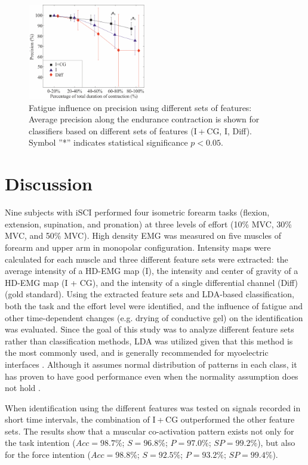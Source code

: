 \begin{figure}[ht]
\centering
\includegraphics[width=0.459\textwidth]{Images/figure1_10.png}
\caption{Fatigue influence on precision using different sets of features: Average precision along the endurance contraction is shown for classifiers based on different sets of features (I + CG, I, Diff). Symbol ”*” indicates statistical significance $p < 0.05$.}
\label{fig:1-10}
\end{figure}      



\section{Discussion}
Nine subjects with iSCI performed four isometric forearm tasks (flexion, extension, supination, and pronation) at three levels of effort (10\% MVC, 30\% MVC, and 50\% MVC). High density EMG was measured on five muscles of forearm and upper arm in monopolar configuration. Intensity maps were calculated for each muscle and three different feature sets were extracted: the average intensity of a HD-EMG map (I), the intensity and center of gravity of a HD-EMG map (I + CG), and the intensity of a single differential channel (Diff) (gold standard). Using the extracted feature sets and LDA-based classification, both the task and the effort level were identified, and the influence of fatigue and other time-dependent changes (e.g. drying of conductive gel) on the identification was evaluated. Since the goal of this study was to analyze different feature sets rather than classification methods, LDA was utilized given that this method is the most commonly used, and is generally recommended for myoelectric interfaces \citep{Hakonen2015}. Although it assumes normal distribution of patterns in each class, it has proven to have good performance even when the normality assumption does not hold \citep{Grouven1996}.

When identification using the different features was tested on signals recorded in short time intervals, the combination of I + CG outperformed the other feature sets. The results show that a muscular co-activation pattern exists not only for the task intention ($Acc = 98.7\%$; $S = 96.8\%$; $P = 97.0\%$; $SP = 99.2\%$), but also for the force intention ($Acc = 98.8\%$; $S = 92.5\%$; $P = 93.2\%$; $SP = 99.4\%$).

